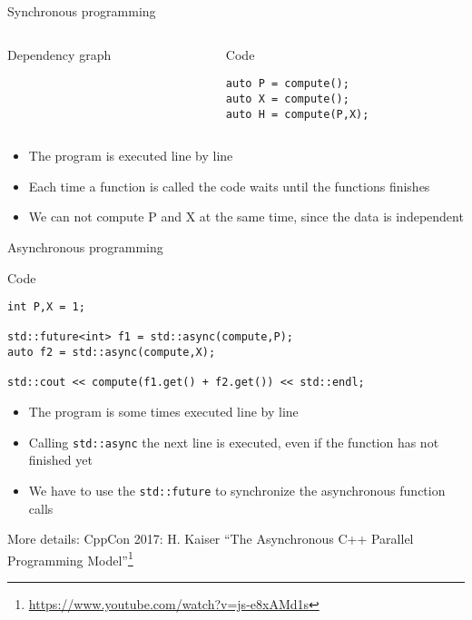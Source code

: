 \documentclass[\classoption]{beamer}
\begin{document}
\begin{frame}[fragile]{Synchronous programming}


\begin{columns}[T]
\begin{column}{0.5\textwidth}
   \begin{block}{Dependency graph}
\begin{center}
\end{center}
\end{block}
\end{column}
\begin{column}{0.5\textwidth}  %
\begin{block}{Code}
\begin{lstlisting}
auto P = compute();
auto X = compute();
auto H = compute(P,X);
\end{lstlisting}
\end{block}
\end{column}
\end{columns}

\begin{itemize}
\item The program is executed line by line
\item Each time a function is called the code waits until the functions finishes
\item We can not compute P and X at the same time, since the data is independent
\end{itemize}
\end{frame}


\begin{frame}[fragile]{Asynchronous programming~\cite{williams2012c++} }
\begin{block}{Code}
\begin{lstlisting}
int P,X = 1;

std::future<int> f1 = std::async(compute,P);
auto f2 = std::async(compute,X);

std::cout << compute(f1.get() + f2.get()) << std::endl;
\end{lstlisting}
\end{block}

\begin{itemize}
\item The program is some times executed line by line
\item Calling \lstinline|std::async| the next line is executed, even if the function has not finished yet
\item We have to use the \lstinline|std::future| to synchronize the asynchronous function calls
\end{itemize}
\tiny More details: CppCon 2017: H. Kaiser “The Asynchronous C++ Parallel Programming Model”\footnote{\tiny\url{https://www.youtube.com/watch?v=js-e8xAMd1s}}
\end{frame}
\end{document}
